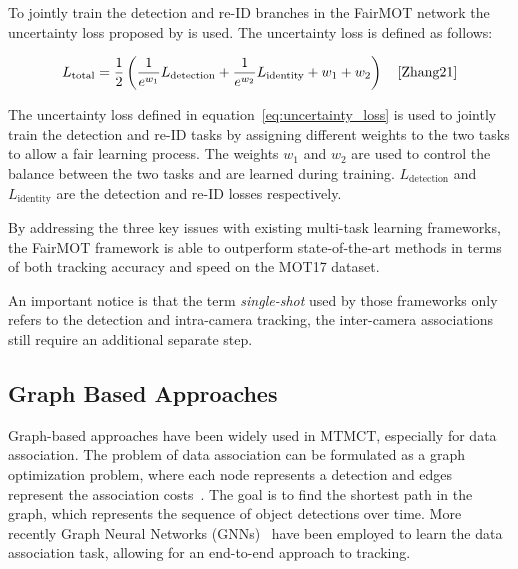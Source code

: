 To jointly train the detection and re-ID branches in the FairMOT network the uncertainty loss proposed by \textcite{Cipolla18} is used. The uncertainty loss is defined as follows:

\begin{equation}
    \label{eq:uncertainty_loss}
    L_{\text{total}}=\frac{1}{2}\left(\frac{1}{e^{w_1}} L_{\text{detection}}+\frac{1}{e^{w_2}} L_{\text{identity}}+w_1+w_2\right)
    \quad\text{\cite[Eq.~5]{Zhang21}}
\end{equation}

The uncertainty loss defined in equation~\ref{eq:uncertainty_loss} is used to jointly train the detection and re-ID tasks by assigning different weights to the two tasks to allow a fair learning process. The weights \(w_1\) and \(w_2\) are used to control the balance between the two tasks and are learned during training. \(L_{\text{detection}}\) and \(L_{\text{identity}}\) are the detection and re-ID losses respectively.

By addressing the three key issues with existing multi-task learning frameworks, the FairMOT framework is able to outperform state-of-the-art methods in terms of both tracking accuracy and speed on the MOT17 dataset.

An important notice is that the term \textit{single-shot} used by those frameworks only refers to the detection and intra-camera tracking, the inter-camera associations still require an additional separate step.

\subsection{Graph Based Approaches}\label{subsec:graph_based_approaches}
Graph-based approaches have been widely used in MTMCT, especially for data association. The problem of data association can be formulated as a graph optimization problem, where each node represents a detection and edges represent the association costs~\cite{Zhang08}. The goal is to find the shortest path in the graph, which represents the sequence of object detections over time. More recently Graph Neural Networks (GNNs)~\cite{Scarselli09} have been employed to learn the data association task, allowing for an end-to-end approach to tracking.


